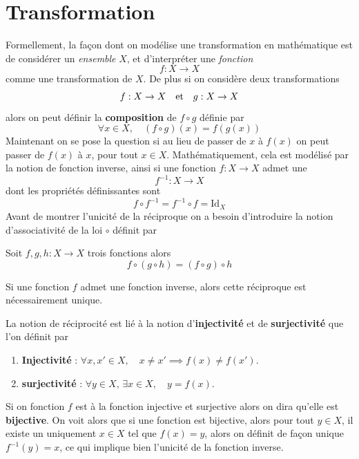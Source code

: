 \chapter{Transformation}
Formellement, la façon dont on modélise une transformation en mathématique est de considérer un \emph{ensemble} $X$, et d'interpréter une \emph{fonction}
\[
f : X \longrightarrow X
\]
comme une transformation de $X$. De plus si on considère deux transformations
\[
f : X \to X \quad \text{et} \quad g : X \to X
\]
alors on peut définir la \textbf{composition} de $f \circ g$ définie par
\[
\forall x \in X, \quad (f \circ g)(x) = f(g(x))
\]
Maintenant on se pose la question si au lieu de passer de $x$ à $f(x)$ on peut passer de $f(x)$ à $x$, pour tout $x \in X$. Mathématiquement, cela est modélisé par la notion de fonction inverse, ainsi si une fonction $f : X \to X$ admet une 
\[
f^{-1} : X \to X
\]
dont les propriétés définissantes sont
\[
f \circ f^{-1} = f^{-1} \circ f = \mathrm{Id}_X
\]
Avant de montrer l'unicité de la réciproque on a besoin d'introduire la notion d'associativité de la loi $\circ$ définit par
\begin{definition}[Associativité] \label{def: Associativité}
	Soit $f,g,h : X \to X$ trois fonctions alors
	\[
	f \circ (g \circ h) = (f \circ g) \circ h
	\]
\end{definition}

\begin{lemme} \label{lem: Unicité de la réciproque}
	Si une fonction $f$ admet une fonction inverse, alors cette réciproque est nécessairement unique.
\end{lemme}



\begin{definition}
	La notion de réciprocité est lié à la notion d'\textbf{injectivité} et de \textbf{surjectivité} que l'on définit par
	\begin{enumerate}
		\item \textbf{Injectivité} : $\forall x,x' \in X, \quad x \neq x' \implies f(x) \neq f(x')$.
		\item \textbf{surjectivité} : $\forall y \in X, \, \exists x \in X, \quad y = f(x)$.
	\end{enumerate}
	Si on fonction $f$ est à la fonction injective et surjective alors on dira qu'elle est \textbf{bijective}. On voit alors que si une fonction est bijective, alors pour tout $y \in X$, il existe un uniquement $x \in X$ tel que $f(x)=y$, alors on définit de façon unique $f^{-1}(y)=x$, ce qui implique bien l'unicité de la fonction inverse.
\end{definition}

